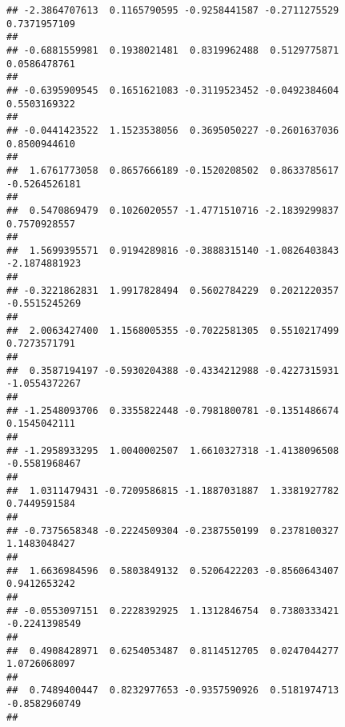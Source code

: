 \documentclass[]{article}
\begin{document}
\begin{verbatim}
## -2.3864707613  0.1165790595 -0.9258441587 -0.2711275529  0.7371957109 
##                                                                       
## -0.6881559981  0.1938021481  0.8319962488  0.5129775871  0.0586478761 
##                                                                       
## -0.6395909545  0.1651621083 -0.3119523452 -0.0492384604  0.5503169322 
##                                                                       
## -0.0441423522  1.1523538056  0.3695050227 -0.2601637036  0.8500944610 
##                                                                       
##  1.6761773058  0.8657666189 -0.1520208502  0.8633785617 -0.5264526181 
##                                                                       
##  0.5470869479  0.1026020557 -1.4771510716 -2.1839299837  0.7570928557 
##                                                                       
##  1.5699395571  0.9194289816 -0.3888315140 -1.0826403843 -2.1874881923 
##                                                                       
## -0.3221862831  1.9917828494  0.5602784229  0.2021220357 -0.5515245269 
##                                                                       
##  2.0063427400  1.1568005355 -0.7022581305  0.5510217499  0.7273571791 
##                                                                       
##  0.3587194197 -0.5930204388 -0.4334212988 -0.4227315931 -1.0554372267 
##                                                                       
## -1.2548093706  0.3355822448 -0.7981800781 -0.1351486674  0.1545042111 
##                                                                       
## -1.2958933295  1.0040002507  1.6610327318 -1.4138096508 -0.5581968467 
##                                                                       
##  1.0311479431 -0.7209586815 -1.1887031887  1.3381927782  0.7449591584 
##                                                                       
## -0.7375658348 -0.2224509304 -0.2387550199  0.2378100327  1.1483048427 
##                                                                       
##  1.6636984596  0.5803849132  0.5206422203 -0.8560643407  0.9412653242 
##                                                                       
## -0.0553097151  0.2228392925  1.1312846754  0.7380333421 -0.2241398549 
##                                                                       
##  0.4908428971  0.6254053487  0.8114512705  0.0247044277  1.0726068097 
##                                                                       
##  0.7489400447  0.8232977653 -0.9357590926  0.5181974713 -0.8582960749 
##                                                                       

\end{verbatim}
\end{document}
